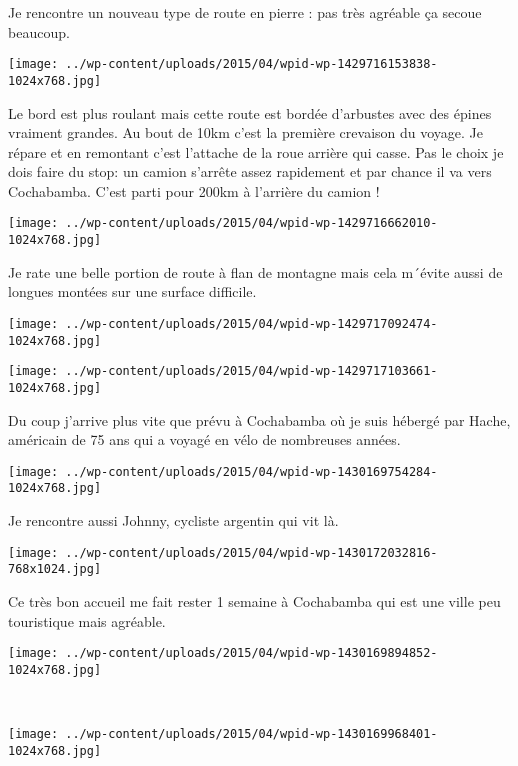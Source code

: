 \pagebreak
 Je rencontre un nouveau type de route en pierre : pas très agréable ça secoue beaucoup. 
\begin{center} \texttt{[image: ../wp-content/uploads/2015/04/wpid-wp-1429716153838-1024x768.jpg]} \end{center}

 Le bord est plus roulant mais cette route est bordée d'arbustes avec des épines vraiment grandes. Au bout de 10km c'est la première crevaison du voyage. Je répare et en remontant c'est l'attache de la roue arrière qui casse. 
 Pas le choix je dois faire du stop: un camion s'arrête assez rapidement et par chance il va vers Cochabamba. C'est parti pour 200km à l'arrière du camion ! 
\begin{center} \texttt{[image: ../wp-content/uploads/2015/04/wpid-wp-1429716662010-1024x768.jpg]} \end{center}

 Je rate une belle portion de route à flan de montagne mais cela m´évite aussi de longues montées sur une surface difficile. 
\begin{center} \texttt{[image: ../wp-content/uploads/2015/04/wpid-wp-1429717092474-1024x768.jpg]} \end{center}
\begin{center} \texttt{[image: ../wp-content/uploads/2015/04/wpid-wp-1429717103661-1024x768.jpg]} \end{center}
\vspace{-\topsep}
\vspace{-2.75mm}

\pagebreak
 Du coup j'arrive plus vite que prévu à Cochabamba où je suis hébergé par Hache, américain de 75 ans qui a voyagé en vélo de nombreuses années. 
\begin{center} \texttt{[image: ../wp-content/uploads/2015/04/wpid-wp-1430169754284-1024x768.jpg]} \end{center}

 Je rencontre aussi Johnny, cycliste argentin qui vit là. 
\begin{center} \texttt{[image: ../wp-content/uploads/2015/04/wpid-wp-1430172032816-768x1024.jpg]} \end{center}

 Ce très bon accueil me fait rester 1 semaine à Cochabamba qui est une ville peu touristique mais agréable. 
\begin{center} \texttt{[image: ../wp-content/uploads/2015/04/wpid-wp-1430169894852-1024x768.jpg]} \end{center}
~\\
\vspace{2.25mm}
\begin{center} \texttt{[image: ../wp-content/uploads/2015/04/wpid-wp-1430169968401-1024x768.jpg]} \end{center}
\vspace{-\topsep}


